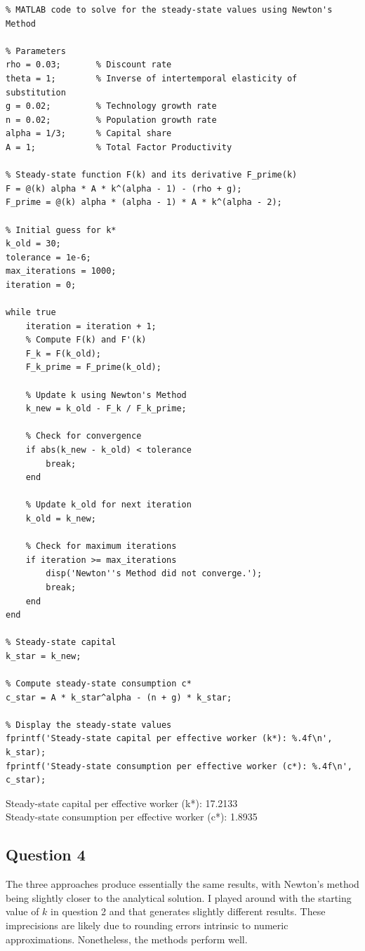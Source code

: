 \documentclass{article}
\begin{document}
\begin{lstlisting}
% MATLAB code to solve for the steady-state values using Newton's Method

% Parameters
rho = 0.03;       % Discount rate
theta = 1;        % Inverse of intertemporal elasticity of substitution
g = 0.02;         % Technology growth rate
n = 0.02;         % Population growth rate
alpha = 1/3;      % Capital share
A = 1;            % Total Factor Productivity

% Steady-state function F(k) and its derivative F_prime(k)
F = @(k) alpha * A * k^(alpha - 1) - (rho + g);
F_prime = @(k) alpha * (alpha - 1) * A * k^(alpha - 2);

% Initial guess for k*
k_old = 30;
tolerance = 1e-6;
max_iterations = 1000;
iteration = 0;

while true
    iteration = iteration + 1;
    % Compute F(k) and F'(k)
    F_k = F(k_old);
    F_k_prime = F_prime(k_old);
    
    % Update k using Newton's Method
    k_new = k_old - F_k / F_k_prime;
    
    % Check for convergence
    if abs(k_new - k_old) < tolerance
        break;
    end
    
    % Update k_old for next iteration
    k_old = k_new;
    
    % Check for maximum iterations
    if iteration >= max_iterations
        disp('Newton''s Method did not converge.');
        break;
    end
end

% Steady-state capital
k_star = k_new;

% Compute steady-state consumption c*
c_star = A * k_star^alpha - (n + g) * k_star;

% Display the steady-state values
fprintf('Steady-state capital per effective worker (k*): %.4f\n', k_star);
fprintf('Steady-state consumption per effective worker (c*): %.4f\n', c_star);
\end{lstlisting}
Steady-state capital per effective worker (k*): 17.2133\\
Steady-state consumption per effective worker (c*): 1.8935\\

\subsection*{Question 4}
The three approaches produce essentially the same results, with Newton's method being slightly closer to the analytical solution. I played around with the starting value of $k$ in question 2 and that generates slightly different results. These imprecisions are likely due to rounding errors intrinsic to numeric approximations. Nonetheless, the methods perform well.
\end{document}
